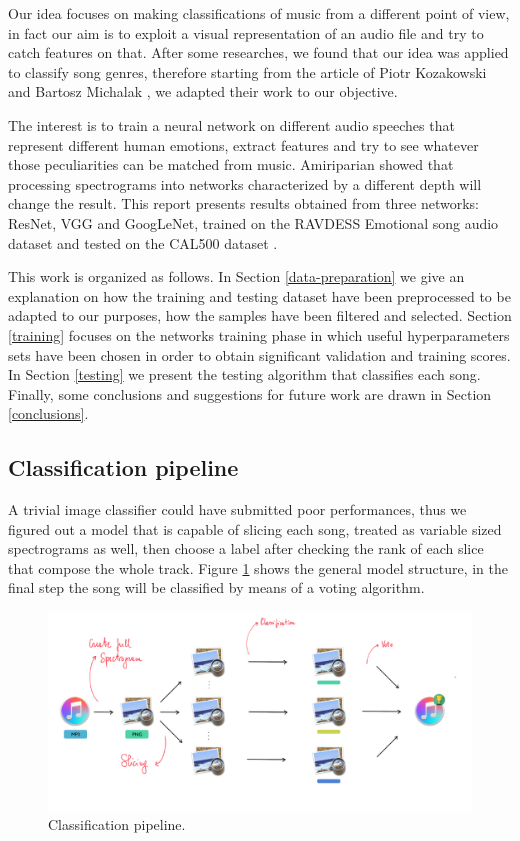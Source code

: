 \documentclass[10pt,twocolumn,letterpaper]{article}
\begin{document}
Our idea focuses on making classifications of music from a different point of view, in fact our aim is to exploit a visual representation of an audio file and try to catch features on that.
After some researches, we found that our idea was applied to classify song genres, therefore starting from the article of Piotr Kozakowski and Bartosz Michalak \cite{Kozakowski}, we adapted their work to our objective.

The interest is to train a neural network on different audio speeches that represent different human emotions, extract features and try to see whatever those peculiarities can be matched from music. Amiriparian \etal \cite{Amiriparian} showed that processing spectrograms into networks characterized by a different depth will change the result. This report presents results obtained from three networks: ResNet, VGG and GoogLeNet, trained on the RAVDESS Emotional song audio dataset \cite{Ravdess} and tested on the CAL500 dataset \cite{CAL500}.

This work is organized as follows. In Section \ref{data-preparation} we give an explanation on how the training and testing dataset have been preprocessed to be adapted to our purposes, how the samples have been filtered and selected. Section \ref{training} focuses on the networks training phase in which useful hyperparameters sets have been chosen in order to obtain significant validation and training scores. In Section \ref{testing} we present the testing algorithm that classifies each song. Finally, some conclusions and suggestions for future work are drawn in Section \ref{conclusions}.

\subsection{Classification pipeline}

A trivial image classifier could have submitted poor performances, thus we figured out a model that is capable of slicing each song, treated as variable sized spectrograms as well, then choose a label after checking the rank of each slice that compose the whole track. Figure \ref{fig:pipeline} shows the general model structure, in the final step the song will be classified by means of a voting algorithm.

\begin{figure}
   \begin{center}
   \includegraphics[width=0.8\linewidth]{img/Pipeline-project}
   \end{center}
      \caption{Classification pipeline.}
   \label{fig:pipeline}
   \end{figure}
\end{document}
